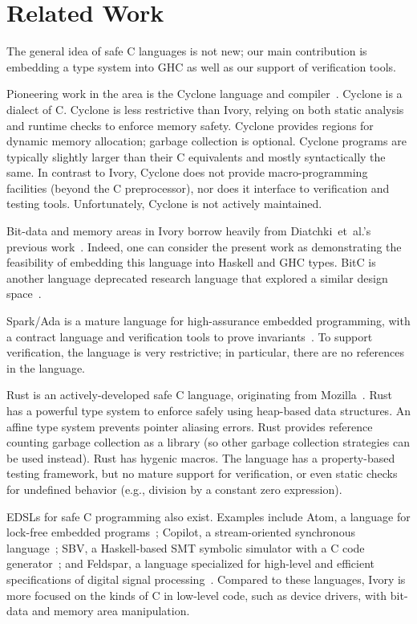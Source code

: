 \section{Related Work}
\label{sec:related-work}

The general idea of safe C languages is not new; our main contribution is
embedding a type system into GHC as well as our support of verification
tools.

Pioneering work in the area is the Cyclone language and
compiler~\cite{cyclone}. Cyclone is a dialect of C. Cyclone is less restrictive than
Ivory, relying on both static analysis and runtime checks to enforce memory
safety. Cyclone provides regions for dynamic memory allocation; garbage
collection is optional. Cyclone programs are typically slightly larger than
their C equivalents and mostly syntactically the same. In contrast to Ivory,
Cyclone does not provide macro-programming facilities (beyond the C
preprocessor), nor does it interface to verification and testing
tools. Unfortunately, Cyclone is not actively maintained.

Bit-data and memory areas in Ivory borrow heavily from Diatchki~et~al.'s
previous work~\cite{high-level, memareas}. Indeed, one can consider the present
work as demonstrating the feasibility of embedding this language into Haskell
and GHC types. BitC is another language deprecated research language that
explored a similar design space~\cite{bitc}.

Spark/Ada is a mature language for high-assurance embedded
programming, with a contract language and verification tools to
prove invariants~\cite{spark}. To support verification, the language is
very restrictive; in particular, there are no references in the language.

Rust is an actively-developed safe C language, originating from
Mozilla~\cite{rust}. Rust has a powerful type system to enforce safely using
heap-based data structures. An affine type system prevents pointer aliasing
errors. Rust provides reference counting garbage collection as a library (so
other garbage collection strategies can be used instead). Rust has hygenic
macros. The language has a property-based testing framework, but no mature
support for verification, or even static checks for undefined behavior (e.g.,
division by a constant zero expression).

EDSLs for safe C programming also exist. Examples include Atom, a language for
lock-free embedded programs~\cite{atom}; Copilot, a stream-oriented synchronous
language~\cite{copilot}; SBV, a Haskell-based SMT symbolic simulator with a C code
generator~\cite{sbv}; and Feldspar, a language specialized for high-level and
efficient specifications of digital signal processing~\cite{feldspar1}. Compared to these
languages, Ivory is more focused on the kinds of C in low-level code, such as
device drivers, with bit-data and memory area manipulation.
